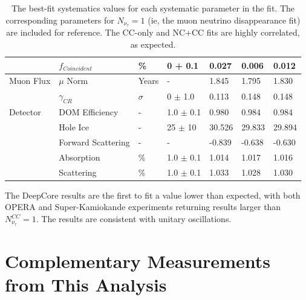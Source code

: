 \begin{landscape}
\begin{table}[]
{\begin{tabular}{@{}lllllll@{}}
                                & $f_{Coincident}$        & \%            & 0 + 0.1            & 0.027           & 0.006          & 0.012         \\ \midrule
Muon Flux                  & $\mu$ Norm              & Years        & -                      & 1.845           & 1.795          & 1.830         \\
                                & $\gamma_{CR}$        & $\sigma$  & 0 $\pm$ 1.0    & 0.113          & 0.148          & 0.148         \\ \midrule
Detector                   & DOM Efficiency            & -               & 1.0 $\pm$ 0.1 & 0.980          & 0.984          & 0.984         \\
                                & Hole Ice                      & -               & 25 $\pm$ 10   & 30.526        & 29.833         & 29.894        \\
                                & Forward Scattering      & -               & -                      & -0.839         & -0.638         & -0.630        \\
                                & Absorption                  & \%           & 1.0 $\pm$ 0.1  & 1.014          & 1.017          & 1.016         \\
                                & Scattering                   & \%           & 1.0 $\pm$ 0.1   & 1.033         & 1.028          & 1.030         \\ \bottomrule
\end{tabular}%
}
\caption[The numerical values of the systematics parameters]{The best-fit systematics values for each systematic parameter in the fit. The corresponding parameters for $N_{\nu_\tau}=1$ (ie, the muon neutrino disappearance fit) are included for reference. The CC-only and NC+CC fits are highly correlated, as expected. }
\label{tab:bestfit_systematics}
\end{table}
\end{landscape}

The DeepCore results are the first to fit a value lower than expected, with both OPERA and Super-Kamiokande experiments returning results larger than $N_{\nu_\tau}^{CC}=1$.
The results are consistent with unitary oscillations.


\label{section:other_measurements}
\section{Complementary Measurements from This Analysis}

